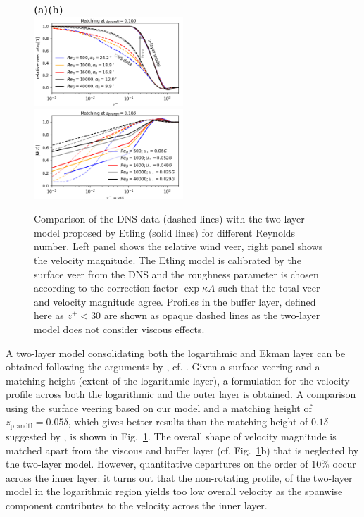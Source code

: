 \documentclass[smallcondensed,final]{svjour3}
\begin{document}
\begin{figure}
  \textbf{(a)\hspace{0.48\textwidth}(b)}\\[-0.15em]
  \includegraphics[width=0.5\textwidth]{../plot/etling_direction_0.png} 
  \includegraphics[width=0.5\textwidth]{../plot/etling_magnitude_0.png}
  \caption{Comparison of the DNS data (dashed lines) with the two-layer model proposed by Etling (solid lines) for different Reynolds number. Left panel shows the relative wind veer, right panel shows the velocity magnitude. The Etling model is calibrated by the surface veer from the DNS and the roughness parameter is chosen according to the correction factor $\exp{\kappa A}$ such that the total veer and velocity magnitude agree. Profiles in the buffer layer, defined here as $z^+<30$ are shown as opaque dashed lines as the two-layer model does not consider viscous effects.}
  \label{fig:etling} 
\end{figure}
A two-layer model consolidating both the logartihmic and Ekman layer can be obtained following the arguments by \cite{etling:2008}, cf. \cite{emeis:2018}. Given a surface veering and a matching height (extent of the logarithmic layer), a formulation for the velocity profile across both the logarithmic and the outer layer is obtained. A comparison using the surface veering based on our model and a matching height of $z_\text{prandtl}=0.05\delta$, which gives better results than the matching height of $0.1\delta$ suggested by \cite{etling:2008}, is shown in Fig.~\ref{fig:etling}. 
% 
The overall shape of velocity magnitude is matched apart from the viscous and buffer layer (cf. Fig.~\ref{fig:etling}b) that is neglected by the two-layer model. However, quantitative departures on the order of 10\% occur across the inner layer: it turns out that the non-rotating profile, of the two-layer model in the logarithmic region yields too low overall velocity as the spanwise component contributes to the velocity across the inner layer. 
\end{document}
